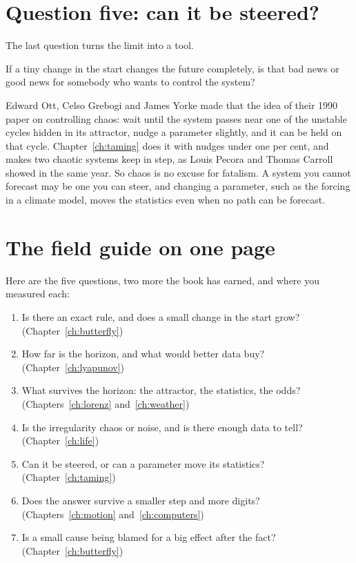 \section{Question five: can it be steered?}
\label{sec:ch18-steer}

\noindent
The last question turns the limit into a tool.

\begin{think}
If a tiny change in the start changes the future completely, is that bad
news or good news for somebody who wants to control the system?
\end{think}
Edward Ott, Celso Grebogi and James Yorke made that the idea of their 1990
paper on controlling chaos: wait until the system passes near one of the
unstable cycles hidden in its attractor, nudge a parameter slightly, and it
can be held on that cycle. Chapter~\ref{ch:taming} does it with nudges
under one per cent, and makes two chaotic systems keep in step, as Louis
Pecora and Thomas Carroll showed in the same year. So chaos is no excuse
for fatalism. A system you cannot forecast may be one you can steer, and
changing a parameter, such as the forcing in a climate model, moves the
statistics even when no path can be forecast.


\section{The field guide on one page}
\label{sec:ch18-guide}

\noindent
Here are the five questions, two more the book has earned, and where you
measured each:

\begin{enumerate}[itemsep=2pt]
\item Is there an exact rule, and does a small change in the start grow?
  (Chapter~\ref{ch:butterfly})
\item How far is the horizon, and what would better data buy?
  (Chapter~\ref{ch:lyapunov})
\item What survives the horizon: the attractor, the statistics, the odds?
  (Chapters~\ref{ch:lorenz} and~\ref{ch:weather})
\item Is the irregularity chaos or noise, and is there enough data to tell?
  (Chapter~\ref{ch:life})
\item Can it be steered, or can a parameter move its statistics?
  (Chapter~\ref{ch:taming})
\item Does the answer survive a smaller step and more digits?
  (Chapters~\ref{ch:motion} and~\ref{ch:computers})
\item Is a small cause being blamed for a big effect after the fact?
  (Chapter~\ref{ch:butterfly})
\end{enumerate}

